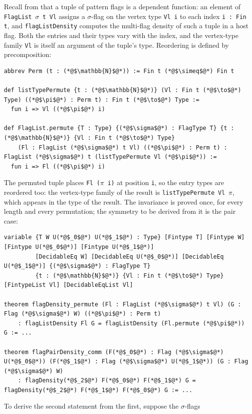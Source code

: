 \documentclass[acmsmall,screen=true,acmthm=false]{acmart}
\DeclareRobustCommand{\lean}[1]{{\def\_{\textunderscore\allowbreak}\texttt{#1}}}
\begin{document}
Recall from  that a tuple of pattern
flags is a dependent function: an element of
\lean{FlagList}~$\sigma$~\lean{t Vl} assigns 
a $\sigma$-flag on the vertex type \lean{Vl i} to each index \lean{i : Fin t}, and \lean{flagListDensity}
computes the multi-flag density of such a tuple in a host flag.  Both the
entries and their types vary with the index, and the vertex-type family
\lean{Vl} is itself an argument of the tuple's type.  Reordering is defined
by precomposition:
\begin{lstlisting}
abbrev Perm (t : (*@$\mathbb{N}$@*)) := Fin t (*@$\simeq$@*) Fin t

def listTypePermute {t : (*@$\mathbb{N}$@*)} (Vl : Fin t (*@$\to$@*) Type) ((*@$\pi$@*) : Perm t) : Fin t (*@$\to$@*) Type :=
  fun i => Vl ((*@$\pi$@*) i)

def FlagList.permute {T : Type} {(*@$\sigma$@*) : FlagType T} {t : (*@$\mathbb{N}$@*)} {Vl : Fin t (*@$\to$@*) Type}
    (Fl : FlagList (*@$\sigma$@*) t Vl) ((*@$\pi$@*) : Perm t) : FlagList (*@$\sigma$@*) t (listTypePermute Vl (*@$\pi$@*)) :=
  fun i => Fl ((*@$\pi$@*) i)
\end{lstlisting}
The permuted tuple places \lean{Fl ($\pi$ i)} at position \lean{i}, so the
entry types are reordered too: the vertex-type family of the result is
\lean{listTypePermute Vl $\pi$}, which appears in the type of the result.
The invariance is proved once, for
every length and every permutation; the symmetry to be derived from it is the
pair case:
\begin{lstlisting}
variable {T W U(*@$_0$@*) U(*@$_1$@*) : Type} [Fintype T] [Fintype W] [Fintype U(*@$_0$@*)] [Fintype U(*@$_1$@*)]
         [DecidableEq W] [DecidableEq U(*@$_0$@*)] [DecidableEq U(*@$_1$@*)] {(*@$\sigma$@*) : FlagType T} 
         {t : (*@$\mathbb{N}$@*)} {Vl : Fin t (*@$\to$@*) Type} [FintypeList Vl] [DecidableEqList Vl]

theorem flagDensity_permute (Fl : FlagList (*@$\sigma$@*) t Vl) (G : Flag (*@$\sigma$@*) W) ((*@$\pi$@*) : Perm t)
    : flagListDensity Fl G = flagListDensity (Fl.permute (*@$\pi$@*)) G := ...

theorem flagPairDensity_comm (F(*@$_0$@*) : Flag (*@$\sigma$@*) U(*@$_0$@*)) (F(*@$_1$@*) : Flag (*@$\sigma$@*) U(*@$_1$@*)) (G : Flag (*@$\sigma$@*) W)
    : flagDensity(*@$_2$@*) F(*@$_0$@*) F(*@$_1$@*) G = flagDensity(*@$_2$@*) F(*@$_1$@*) F(*@$_0$@*) G := ...
\end{lstlisting}
To derive the second statement from the first, suppose the $\sigma$-flags
\end{document}
